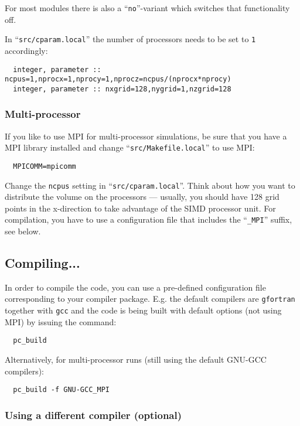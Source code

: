 \documentclass[a4paper,12pt]{article}
\newcommand{\command}[1]{\texttt{#1}}
\newcommand{\file}[1]{``\texttt{#1}''}
\newcommand{\name}[1]{\textsc{#1}}
\newcommand{\code}[1]{\texttt{#1}}
\begin{document}
For most modules there is also a \file{no}-variant which switches that functionality off.

In \file{src/cparam.local} the number of processors needs to be set to \code{1} accordingly:
\begin{verbatim}
  integer, parameter :: ncpus=1,nprocx=1,nprocy=1,nprocz=ncpus/(nprocx*nprocy)
  integer, parameter :: nxgrid=128,nygrid=1,nzgrid=128
\end{verbatim}

\subsubsection{Multi-processor}
If you like to use \name{MPI} for multi-processor simulations, be sure that you have a \name{MPI} library installed and change \file{src/Makefile.local} to use \name{MPI}:
\begin{verbatim}
  MPICOMM=mpicomm
\end{verbatim}

Change the \code{ncpus} setting in \file{src/cparam.local}.
Think about how you want to distribute the volume on the processors --- usually, you should have 128 grid points in the x-direction to take advantage of the SIMD processor unit.
For compilation, you have to use a configuration file that includes the \file{\_MPI} suffix, see below.

\subsection{Compiling...}

In order to compile the code, you can use a pre-defined configuration file corresponding to your compiler package.
E.g. the default compilers are \command{gfortran} together with \command{gcc} and the code is being built with default options (not using \name{MPI}) by issuing the command:

\begin{verbatim}
  pc_build
\end{verbatim}

Alternatively, for multi-processor runs (still using the default \name{GNU-GCC} compilers):
\begin{verbatim}
  pc_build -f GNU-GCC_MPI
\end{verbatim}

\subsubsection{Using a different compiler (optional)}
\end{document}

